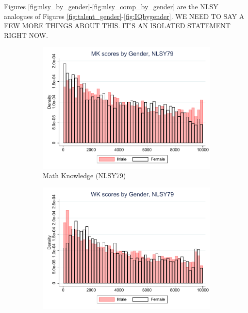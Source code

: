 \documentclass[onehalfspacing,11pt]{article}
\begin{document}
Figures \ref{fig:nlsy_by_gender}-\ref{fig:nlsy_comp_by_gender} are the NLSY analogues of Figures \ref{fig:talent_gender}-\ref{fig:IQbygender}. WE NEED TO SAY A FEW MORE THINGS ABOUT THIS. IT'S AN ISOLATED STATEMENT RIGHT NOW.

\begin{figure}
	\begin{subfigure}{0.49\textwidth}
		\includegraphics[width=\linewidth]{NLSY79_MK_gender.pdf}
		\caption{Math Knowledge (NLSY79)} \label{fig:nlsy79math}
	\end{subfigure}
	\hspace*{\fill} %
	\begin{subfigure}{0.49\textwidth}
		\includegraphics[width=\linewidth]{NLSY79_WK_gender.pdf}

\end{subfigure}
\end{figure}
\end{document}
